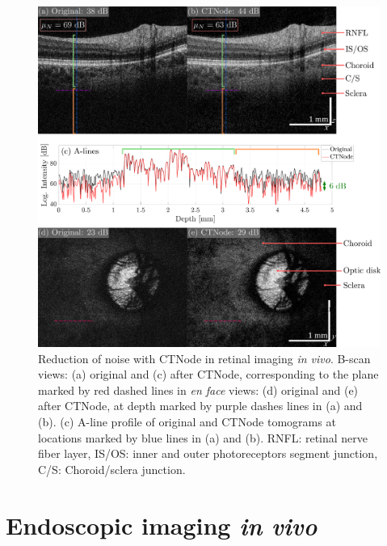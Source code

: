 \begin{figure}[htb!]
	\centering
	\includegraphics[width=\textwidth]{Figures/Results/RetinalCTNode.pdf}
	\caption[Reduction of noise with CTNode in retinal imaging \textit{in vivo}.]{Reduction of noise with CTNode in retinal imaging \textit{in vivo}. B-scan views: (a) original and (c) after CTNode, corresponding to the plane marked by red dashed lines in \textit{en face} views: (d) original and (e) after CTNode, at depth marked by purple dashes lines in (a) and (b). (c) A-line profile of original and CTNode tomograms at locations marked by blue lines in (a) and (b). RNFL: retinal nerve fiber layer, IS/OS: inner and outer photoreceptors segment junction, C/S: Choroid/sclera junction. }
	\label{fig:RetinalCTNode}
\end{figure}

\FloatBarrier

\section{Endoscopic imaging \textit{in vivo}}

